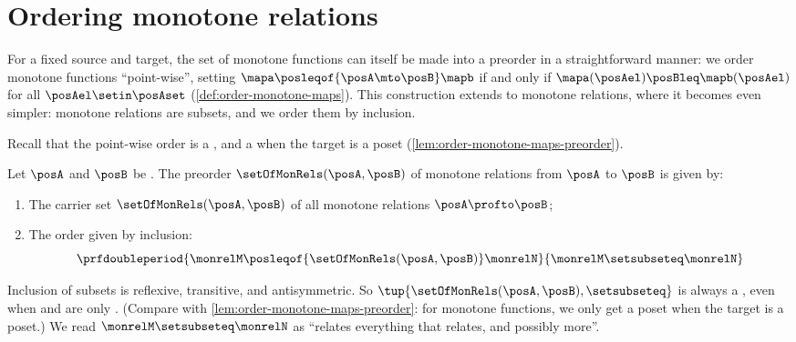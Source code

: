 
\section{Ordering monotone relations}
\label{sec:ordering-monotone-relations}

For a fixed source and target, the set of monotone functions can itself be made into a preorder in a straightforward manner: we order monotone functions ``point-wise'', setting $\mapa \posleqof{\posA \mto \posB} \mapb$ if and only if $\mapa(\posAel) \posBleq \mapb(\posAel)$ for all $\posAel \setin \posAset$ (\cref{def:order-monotone-maps}).
This construction extends to monotone relations, where it becomes even simpler: monotone relations are subsets, and we order them by inclusion.

Recall that the point-wise order is a , and a  when the target is a poset (\cref{lem:order-monotone-maps-preorder}).

\begin{ctdefinition}
    \label{def:order-monotone-relations}
    Let $\posA$ and $\posB$ be .
    The preorder $\setOfMonRels(\posA, \posB)$ of monotone relations from $\posA$ to $\posB$ is given by:

    \constit
    \begin{enumerate}
        \item The carrier set $\setOfMonRels(\posA, \posB)$ of all monotone relations $\posA \profto \posB$;
        \item The order given by inclusion:
              \begin{equation}
                  \prfdoubleperiod{
                      \monrelM \posleqof{\setOfMonRels(\posA, \posB)} \monrelN
                  }{
                      \monrelM \setsubseteq \monrelN
                  }
              \end{equation}
    \end{enumerate}
\end{ctdefinition}

Inclusion of subsets is reflexive, transitive, and antisymmetric.
So $\tup{\setOfMonRels(\posA, \posB), \setsubseteq}$ is always a , even when \posA and \posB are only .
(Compare with \cref{lem:order-monotone-maps-preorder}: for monotone functions, we only get a poset when the target is a poset.)
We read $\monrelM \setsubseteq \monrelN$ as ``\monrelN relates everything that \monrelM relates, and possibly more''.

